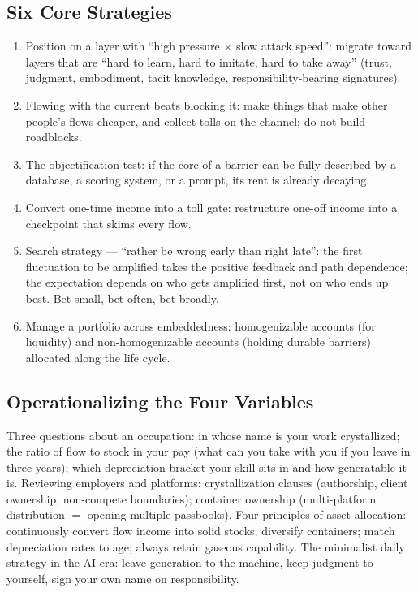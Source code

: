 \documentclass[11pt]{article}
\begin{document}
\subsection{Six Core Strategies}
\begin{enumerate}[leftmargin=2em]
\item Position on a layer with ``high pressure $\times$ slow attack speed'': migrate toward layers that are ``hard to learn, hard to imitate, hard to take away'' (trust, judgment, embodiment, tacit knowledge, responsibility-bearing signatures).
\item Flowing with the current beats blocking it: make things that make other people's flows cheaper, and collect tolls on the channel; do not build roadblocks.
\item The objectification test: if the core of a barrier can be fully described by a database, a scoring system, or a prompt, its rent is already decaying.
\item Convert one-time income into a toll gate: restructure one-off income into a checkpoint that skims every flow.
\item Search strategy --- ``rather be wrong early than right late'': the first fluctuation to be amplified takes the positive feedback and path dependence; the expectation depends on who gets amplified first, not on who ends up best. Bet small, bet often, bet broadly.
\item Manage a portfolio across embeddedness: homogenizable accounts (for liquidity) and non-homogenizable accounts (holding durable barriers) allocated along the life cycle.
\end{enumerate}

\subsection{Operationalizing the Four Variables}
Three questions about an occupation: in whose name is your work crystallized; the ratio of flow to stock in your pay (what can you take with you if you leave in three years); which depreciation bracket your skill sits in and how generatable it is. Reviewing employers and platforms: crystallization clauses (authorship, client ownership, non-compete boundaries); container ownership (multi-platform distribution $=$ opening multiple passbooks). Four principles of asset allocation: continuously convert flow income into solid stocks; diversify containers; match depreciation rates to age; always retain gaseous capability. The minimalist daily strategy in the AI era: leave generation to the machine, keep judgment to yourself, sign your own name on responsibility.
\end{document}
